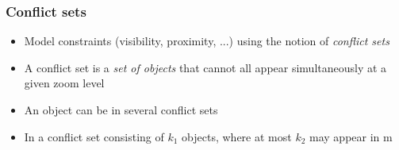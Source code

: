 \documentclass{beamer}
\begin{document}
\frame
{
  \frametitle{Conflict sets}
  \begin{itemize}
  \item Model constraints (visibility, proximity, ...) using the notion of \emph{conflict sets}
  \item A conflict set is a \emph{set of objects} that cannot all appear simultaneously at a given zoom level
  \item An object can be in several conflict sets
  \item In a conflict set consisting of $k_1$ objects, where at most $k_2$ may appear in m
\end{itemize}}
\end{document}
